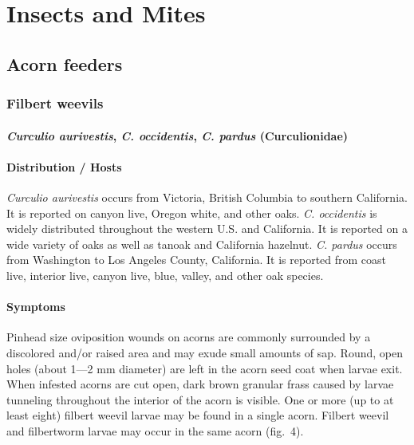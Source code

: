 \documentclass[
]{book}
\begin{document}
\part{Insects and Mites}\label{part-insects-and-mites}

\chapter*{Acorn feeders}\label{acorn-feeders}

\section*{Filbert weevils}\label{filbert-weevils}

\subsection*{\texorpdfstring{\emph{Curculio aurivestis}, \emph{C. occidentis}, \emph{C. pardus} (Curculionidae)}{Curculio aurivestis, C. occidentis, C. pardus (Curculionidae)}}\label{curculio-aurivestis-c.-occidentis-c.-pardus-curculionidae}

\subsection*{Distribution / Hosts}\label{distribution-hosts}

\emph{Curculio aurivestis} occurs from Victoria, British Columbia to southern California. It is reported on canyon live, Oregon white, and other oaks.
\emph{C. occidentis} is widely distributed throughout the western U.S. and California. It is reported on a wide variety of oaks as well as tanoak and California hazelnut.
\emph{C. pardus} occurs from Washington to Los Angeles County, California. It is reported from coast live, interior live, canyon live, blue, valley, and other oak species.

\subsection*{Symptoms}\label{symptoms}

Pinhead size oviposition wounds on acorns are commonly surrounded by a discolored and/or raised area and may exude small amounts of sap. Round, open holes (about 1---2 mm diameter) are left in the acorn seed coat when larvae exit. When infested acorns are cut open, dark brown granular frass caused by larvae tunneling throughout the interior of the acorn is visible. One or more (up to at least eight) filbert weevil larvae may be found in a single acorn. Filbert weevil and filbertworm larvae may occur in the same acorn (fig.~4).
\end{document}
